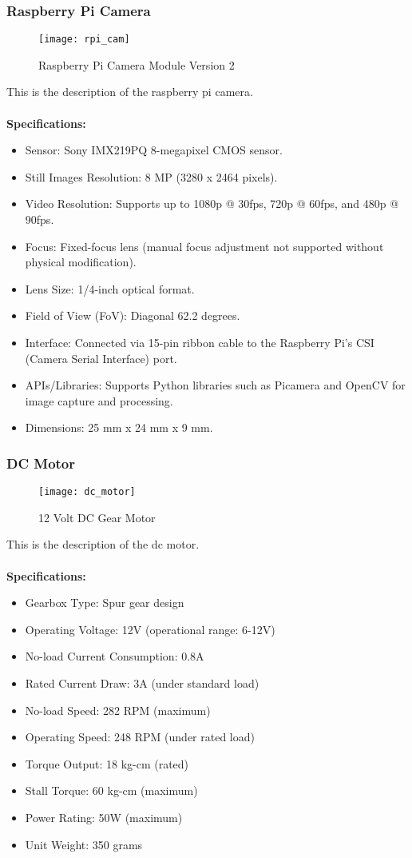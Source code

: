 \subsubsection{Raspberry Pi Camera}
\begin{figure}[!htbp]
	\centering
	\texttt{[image: rpi\_cam]}
	\caption{Raspberry Pi Camera Module Version 2}
	\label{fig:rpi_cam_fig}
\end{figure}
This is the description of the raspberry pi camera.
\\
\\
\textbf{Specifications:}
\begin{itemize}
    \item Sensor: Sony IMX219PQ 8-megapixel CMOS sensor.
    \item Still Images Resolution: 8 MP (3280 x 2464 pixels).
    \item Video Resolution: Supports up to 1080p @ 30fps, 720p @ 60fps, and 480p @ 90fps.
    \item Focus: Fixed-focus lens (manual focus adjustment not supported without physical modification).
    \item Lens Size: 1/4-inch optical format.
    \item Field of View (FoV): Diagonal 62.2 degrees.
    \item Interface: Connected via 15-pin ribbon cable to the Raspberry Pi's CSI (Camera Serial Interface) port.
    \item APIs/Libraries: Supports Python libraries such as Picamera and OpenCV for image capture and processing.
    \item Dimensions: 25 mm x 24 mm x 9 mm.
\end{itemize}

\subsubsection{DC Motor}
\begin{figure}[!htbp]
	\centering
	\texttt{[image: dc\_motor]}
	\caption{12 Volt DC Gear Motor}
	\label{fig:dc_motor_fig}
\end{figure}
This is the description of the dc motor.
\\
\\
\textbf{Specifications:}
\begin{itemize}
    \item Gearbox Type: Spur gear design
    \item Operating Voltage: 12V (operational range: 6-12V)
    \item No-load Current Consumption: 0.8A
    \item Rated Current Draw: 3A (under standard load)
    \item No-load Speed: 282 RPM (maximum)
    \item Operating Speed: 248 RPM (under rated load)
    \item Torque Output: 18 kg-cm (rated)
    \item Stall Torque: 60 kg-cm (maximum)
    \item Power Rating: 50W (maximum)
    \item Unit Weight: 350 grams
\end{itemize}


